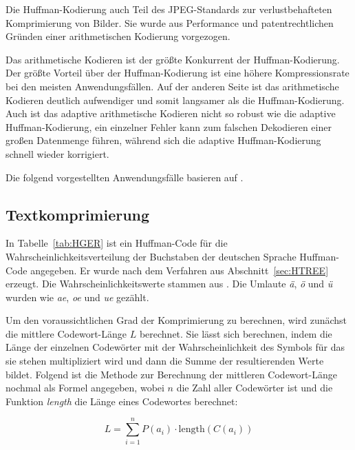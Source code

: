 \documentclass[twoside,11pt,a4paper]{article}
\theoremstyle{break}
\begin{document}
Die Huffman-Kodierung auch Teil des JPEG-Standards zur
verlustbehafteten Komprimierung von Bilder. Sie wurde aus Performance
und patentrechtlichen Gründen einer arithmetischen Kodierung
vorgezogen. \cite{Wallace:1991}

Das arithmetische Kodieren ist der größte Konkurrent der
Huffman-Kodierung. Der größte Vorteil über der Huffman-Kodierung ist
eine höhere Kompressionsrate bei den meisten Anwendungsfällen. Auf der
anderen Seite ist das arithmetische Kodieren deutlich aufwendiger und
somit langsamer als die Huffman-Kodierung. Auch ist das adaptive
arithmetische Kodieren nicht so robust wie die adaptive
Huffman-Kodierung, ein einzelner Fehler kann zum falschen Dekodieren
einer großen Datenmenge führen, während sich die adaptive
Huffman-Kodierung schnell wieder korrigiert. \cite{Bookstein:1993}






Die folgend vorgestellten Anwendungsfälle basieren auf \cite{Sayood:2006}.

\subsection{Textkomprimierung}

In Tabelle~\ref{tab:HGER} ist ein Huffman-Code für die
Wahrscheinlichkeitsverteilung der Buchstaben der deutschen Sprache
Huffman-Code angegeben. Er wurde nach dem Verfahren aus
Abschnitt~\ref{sec:HTREE} erzeugt. Die Wahrscheinlichkeitswerte
stammen aus \cite{Beutelspacher:2005}. Die Umlaute \emph{ä}, \emph{ö}
und \emph{ü} wurden wie \emph{ae}, \emph{oe} und \emph{ue} gezählt.

Um den voraussichtlichen Grad der Komprimierung zu berechnen, wird
zunächst die mittlere Codewort-Länge $L$ berechnet. Sie lässt sich
berechnen, indem die Länge der einzelnen Codewörter mit der
Wahrscheinlichkeit des Symbols für das sie stehen multipliziert wird
und dann die Summe der resultierenden Werte bildet. Folgend ist die
Methode zur Berechnung der mittleren Codewort-Länge nochmal als Formel
angegeben, wobei $n$ die Zahl aller Codewörter ist und die
Funktion \emph{length} die Länge eines Codewortes berechnet:

\begin{equation}
L = \sum_{i=1}^{n} P(a_i) \cdot \mathrm{length}(C(a_i))
\end{equation}
\end{document}
